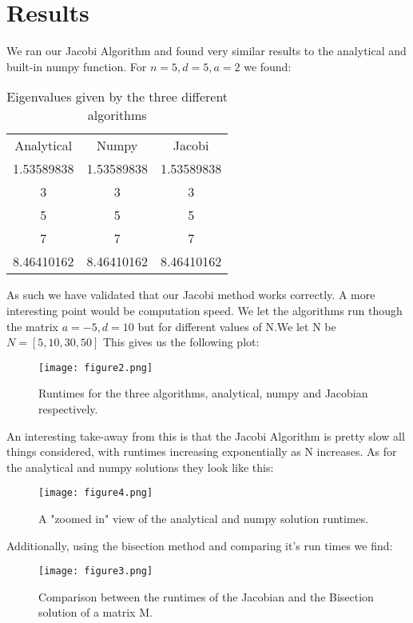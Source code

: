 \documentclass{article}
\begin{document}
\section{Results}
We ran our Jacobi Algorithm and found very similar results to the analytical and built-in numpy function. \newline For $n = 5, d = 5, a = 2$ we found:
\begin{table}[ht!]
    \centering
    \begin{tabular}{c|c|c}
         Analytical& Numpy& Jacobi& \\
         1.53589838& 1.53589838& 1.53589838& \\
         3& 3& 3& \\
         5& 5& 5& \\
         7& 7& 7& \\
         8.46410162& 8.46410162& 8.46410162& 
    \end{tabular}
    \caption{Eigenvalues given by the three different algorithms}
    \label{tab:my_label}
\end{table}
\newline
As such we have validated that our Jacobi method works correctly. A more interesting point would be computation speed. \newline
We let the algorithms run though the matrix $a = -5, d = 10$ but for different values of N.\newline We let N be $N = [5,10,30,50]$
This gives us the following plot:
\begin{figure}[ht!]
    \centering
    \texttt{[image: figure2.png]}
    \caption{Runtimes for the three algorithms, analytical, numpy and Jacobian respectively.}
    \label{fig:1}
\end{figure} \newline
An interesting take-away from this is that the Jacobi Algorithm is pretty slow all things considered, with runtimes increasing exponentially as N increases. \newpage As for the analytical and numpy solutions they look like this:
\begin{figure}[ht!]
    \centering
    \texttt{[image: figure4.png]}
    \caption{A "zoomed in" view of the analytical and numpy solution runtimes.}
    \label{fig:2}
\end{figure} \newline
Additionally, using the bisection method and comparing it's run times we find:
\begin{figure}[ht]
    \centering
    \texttt{[image: figure3.png]}
    \caption{Comparison between the runtimes of the Jacobian and the Bisection solution of a matrix M.}
    \label{fig:3}
\end{figure} \newline
\end{document}
